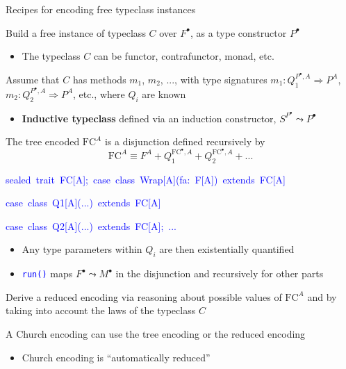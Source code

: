 \documentclass[english,,russian]{beamer}
\newenvironment{lyxcode}
  {\par\begin{list}{}{
    \setlength{\rightmargin}{\leftmargin}
    \setlength{\listparindent}{0pt}%
    \raggedright
    \setlength{\itemsep}{0pt}
    \setlength{\parsep}{0pt}
    \normalfont\ttfamily}%
   \def\{{\char`\{}
   \def\}{\char`\}}
   \def\textasciitilde{\char`\~}
   \item[]}
  {\end{list}}
\begin{document}
\begin{frame}{Recipes for encoding free typeclass instances}
\begin{itemize}
\item Build a free instance of typeclass $C$ over $F^{\bullet}$, as a
type constructor $P^{\bullet}$ 
\begin{itemize}
\item The typeclass $C$ can be functor, contrafunctor, monad, etc.
\end{itemize}
\item Assume that $C$ has methods $m_{1}$, $m_{2}$, ..., with type signatures
{\footnotesize{}$m_{1}:Q_{1}^{P^{\bullet},A}\Rightarrow P^{A}$},
{\footnotesize{}$m_{2}:Q_{2}^{P^{\bullet},A}\Rightarrow P^{A}$},
etc., where $Q_{i}$ are known
\begin{itemize}
\item \textbf{Inductive typeclass} defined via an induction constructor,
$S^{P^{\bullet}}\leadsto P^{\bullet}$
\end{itemize}
\item The tree encoded $\text{FC}^{A}$ is a disjunction defined recursively
by{\footnotesize{}
\[
\text{FC}^{A}\equiv F^{A}+Q_{1}^{\text{FC}^{\bullet},A}+Q_{2}^{\text{FC}^{\bullet},A}+...
\]
}{\footnotesize\par}
\begin{lyxcode}
{\footnotesize{}\vspace{-0.35cm}}\textcolor{blue}{\footnotesize{}sealed~trait~FC{[}A{]};~case~class~Wrap{[}A{]}(fa:~F{[}A{]})~extends~FC{[}A{]}}{\footnotesize\par}

\textcolor{blue}{\footnotesize{}case~class~Q1{[}A{]}(...)~extends~FC{[}A{]}}{\footnotesize\par}

\textcolor{blue}{\footnotesize{}case~class~Q2{[}A{]}(...)~extends~FC{[}A{]};~...}{\footnotesize\par}
\end{lyxcode}
\begin{itemize}
\item Any type parameters within $Q_{i}$ are then existentially quantified
\item \texttt{\textcolor{blue}{\footnotesize{}run()}} maps $F^{\bullet}\leadsto M^{\bullet}$
in the disjunction and recursively for other parts
\end{itemize}
\item Derive a reduced encoding via reasoning about possible values of $\text{FC}^{A}$
and by taking into account the laws of the typeclass $C$
\item A Church encoding can use the tree encoding or the reduced encoding
\begin{itemize}
\item Church encoding is ``automatically reduced''
\end{itemize}
\end{itemize}
\end{frame}
\end{document}
